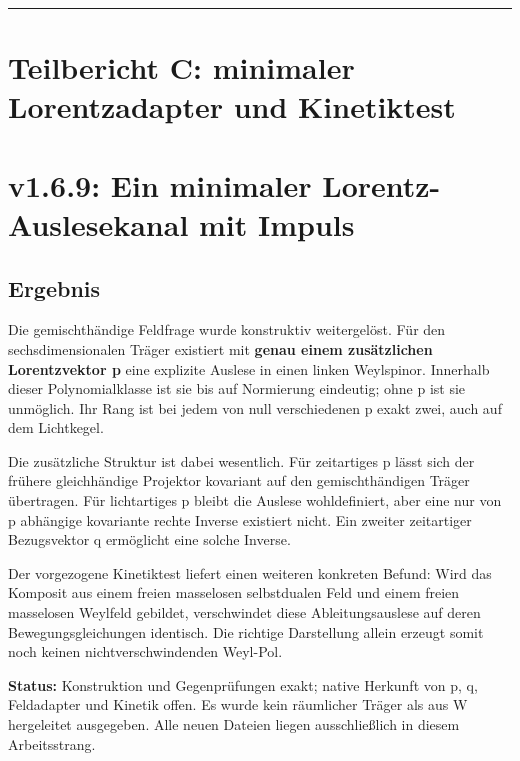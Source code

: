 \begin{center}\rule{0.5\linewidth}{0.5pt}\end{center}

\section{Teilbericht C: minimaler Lorentzadapter und
Kinetiktest}\label{teilbericht-c-minimaler-lorentzadapter-und-kinetiktest}

\section{v1.6.9: Ein minimaler Lorentz-Auslesekanal mit
Impuls}\label{v1.6.9-ein-minimaler-lorentz-auslesekanal-mit-impuls}

\subsection{Ergebnis}\label{ergebnis}

Die gemischthändige Feldfrage wurde konstruktiv weitergelöst. Für den
sechsdimensionalen Träger  existiert mit \textbf{genau
einem zusätzlichen Lorentzvektor p} eine explizite Auslese in einen
linken Weylspinor. Innerhalb dieser Polynomialklasse ist sie bis auf
Normierung eindeutig; ohne p ist sie unmöglich. Ihr Rang ist bei jedem
von null verschiedenen p exakt zwei, auch auf dem Lichtkegel.

Die zusätzliche Struktur ist dabei wesentlich. Für zeitartiges p lässt
sich der frühere gleichhändige Projektor kovariant auf den
gemischthändigen Träger übertragen. Für lichtartiges p bleibt die
Auslese wohldefiniert, aber eine nur von p abhängige kovariante rechte
Inverse existiert nicht. Ein zweiter zeitartiger Bezugsvektor q
ermöglicht eine solche Inverse.

Der vorgezogene Kinetiktest liefert einen weiteren konkreten Befund:
Wird das Komposit aus einem freien masselosen selbstdualen Feld und
einem freien masselosen Weylfeld gebildet, verschwindet diese
Ableitungsauslese auf deren Bewegungsgleichungen identisch. Die richtige
Darstellung allein erzeugt somit noch keinen nichtverschwindenden
Weyl-Pol.

\textbf{Status:} Konstruktion und Gegenprüfungen exakt; native Herkunft
von p, q, Feldadapter und Kinetik offen. Es wurde kein räumlicher Träger
als aus W hergeleitet ausgegeben. Alle neuen Dateien liegen
ausschließlich in diesem Arbeitsstrang.

